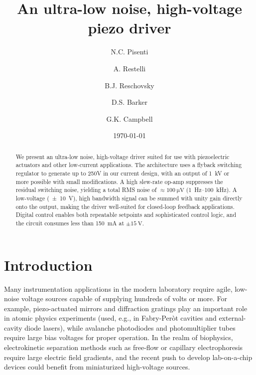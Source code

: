 \documentclass[aip,rsi,reprint]{revtex4-1} %
\begin{document}
\title{An ultra-low noise, high-voltage piezo driver}

\author{N.C. Pisenti}
\author{A. Restelli}
\author{B.J. Reschovsky}
\author{D.S. Barker}
\author{G.K. Campbell}

\date{\today}

\begin{abstract}
We present an ultra-low noise, high-voltage driver suited for use with piezoelectric actuators and other low-current applications. 
The architecture uses a flyback switching regulator to generate up to 250V in our current design, with an output of \SI{1}{\kilo\volt} or more possible with small modifications. 
A high slew-rate op-amp suppresses the residual switching noise, yielding a total RMS noise of $\approx\SI{100}{\micro\volt}$ (\SI{1}{\hertz}--\SI{100}{\kilo\hertz}).
A low-voltage (\SI{\pm 10}{\volt}), high bandwidth signal can be summed with unity gain directly onto the output, making the driver well-suited for closed-loop feedback applications.
Digital control enables both repeatable setpoints and sophisticated control logic, and the circuit consumes less than \SI{150}{\milli\ampere} at $\pm\SI{15}{\volt}$.
\end{abstract}

\pacs{}%

\maketitle %

\section{Introduction}
\label{Sec:Introduction}

Many instrumentation applications in the modern laboratory require agile, low-noise voltage sources capable of supplying hundreds of volts or more.
For example, piezo-actuated mirrors and diffraction gratings play an important role in atomic physics experiments (used, e.g., in Fabry-Per{\`o}t cavities\cite{Riedle1994a,Bohlouli-Zanjani2006a} and external-cavity diode lasers\cite{Wieman1991a}), while avalanche photodiodes and photomultiplier tubes require large bias voltages for proper operation.
In the realm of biophysics, electrokinetic separation methods such as free-flow or capillary electrophoresis\cite{Kohlheyer2008a} require large electric field gradients, and the recent push to develop lab-on-a-chip devices could benefit from miniaturized high-voltage sources.\cite{Temiz2015a}
\end{document}
